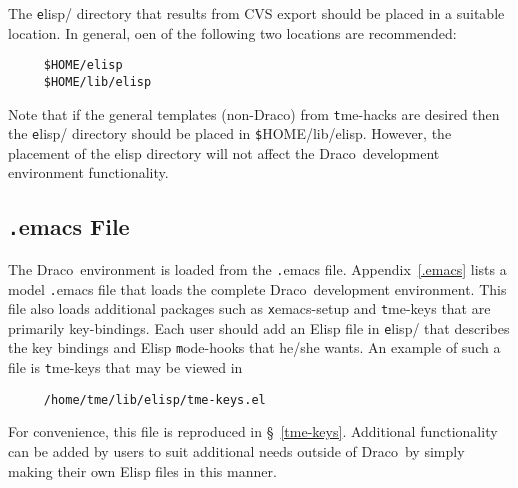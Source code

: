 \documentclass[11pt]{nmemo}
\newcommand{\comp}[1]{{\normalfont\texttt#1}}
\newcommand{\draco}{{\normalfont\sffamily Draco}}
\begin{document}
The \comp{elisp/} directory that results from CVS export should be
placed in a suitable location.  In general, oen of the following two
locations are recommended:
\begin{verbatim}
     $HOME/elisp
     $HOME/lib/elisp
\end{verbatim}
Note that if the general templates (non-\draco) from \comp{tme-hacks}
are desired then the \comp{elisp/} directory should be placed in
\comp{\$HOME/lib/elisp}.  However, the placement of the elisp
directory will not affect the \draco\ development environment
functionality.

\subsection{\comp{.emacs} File}
\label{sec:.emacs}

The \draco\ environment is loaded from the \comp{.emacs} file.
Appendix~\ref{.emacs} lists a model \comp{.emacs} file that loads the
complete \draco\ development environment.  This file also loads
additional packages such as \comp{xemacs-setup} and \comp{tme-keys}
that are primarily key-bindings.  Each user should add an Elisp file
in \comp{elisp/} that describes the key bindings and Elisp
\comp{mode-hooks} that he/she wants.  An example of such a file is
\comp{tme-keys} that may be viewed in
\begin{verbatim}
     /home/tme/lib/elisp/tme-keys.el
\end{verbatim}
For convenience, this file is reproduced in \S~\ref{tme-keys}.
Additional functionality can be added by users to suit additional
needs outside of \draco\ by simply making their own Elisp files in
this manner.
\end{document}
